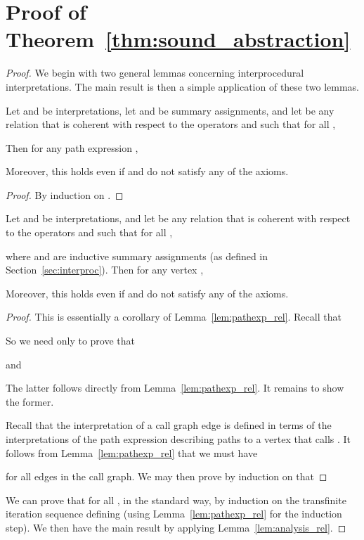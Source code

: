 



\appendix

 \section{Proof of Theorem~\ref{thm:sound_abstraction}}
 \begin{proof}
   We begin with two general lemmas concerning interprocedural
   interpretations.  The main result is then a simple application of these two
   lemmas.
   \begin{lemma} \label{lem:pathexp_rel}
     Let  and
      be \QPKA{}
     interpretations, let  and  be summary
     assignments, and let  be
     any relation that is coherent with respect to the \QPKA{} operators and
     such that for all , 
     
     Then for any path expression ,
     

     Moreover, this holds even if  and  do not
     satisfy any of the \QPKA{} axioms.
   \end{lemma}
   \begin{proof}
     By induction on .
   \end{proof}
   \begin{lemma} \label{lem:analysis_rel}
     Let  and
      be \QPKA{}
     interpretations, and let  be any relation that is coherent with respect to the
     \QPKA{} operators and such that for all ,
     
     where  and  are
     inductive summary assignments (as defined in
     Section~\ref{sec:interproc}). Then for any vertex ,
     

     Moreover, this holds even if  and  do not
     satisfy any of the \QPKA{} axioms.
   \end{lemma}
   \begin{proof}
     This is essentially a corollary of Lemma~\ref{lem:pathexp_rel}.  Recall
     that
     
     
   So we need only to prove that
   
   and 
   
   The latter follows directly from Lemma~\ref{lem:pathexp_rel}.  It remains
   to show the former.

   Recall that the interpretation of a call graph edge 
   is defined in terms of the interpretations of the path expression
    describing paths to a vertex  that calls .
   It follows from Lemma~\ref{lem:pathexp_rel} that we must have
   
   for all edges  in the call graph.  We may then prove by
   induction on  that
   
   \end{proof}
   We can prove that for all ,
    in the
   standard way, by induction on the transfinite iteration sequence defining
    (using Lemma~\ref{lem:pathexp_rel} for the
   induction step).  We then have the main result by applying
   Lemma~\ref{lem:analysis_rel}.
 \end{proof}










